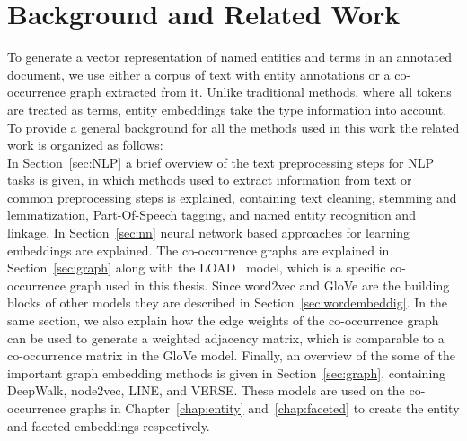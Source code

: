 
\chapter{Background and Related Work}\label{chap:background}
To generate a vector representation of named entities and terms in an annotated document, we use either a corpus of text with entity annotations or a co-occurrence graph extracted from it. Unlike traditional methods, where all tokens are treated as terms, entity embeddings take the type information into account. To provide a general background for all the methods used in this work the related work is organized as follows:\\
In Section~\ref{sec:NLP} a brief overview of the text preprocessing steps for NLP tasks is given, in which methods used to extract information from text or common preprocessing steps is explained, containing text cleaning, stemming and lemmatization, Part-Of-Speech tagging, and named entity recognition and linkage. In Section~\ref{sec:nn} neural network based approaches for learning embeddings are explained. The co-occurrence graphs are explained in Section~\ref{sec:graph} along with the LOAD~ model, which is a specific co-occurrence graph used in this thesis. Since word2vec and GloVe are the building blocks of other models they are described in Section~\ref{sec:wordembeddig}. In the same section, we also explain how the edge weights of the co-occurrence graph can be used to generate a weighted adjacency matrix, which is comparable to a co-occurrence matrix in the GloVe model.  Finally, an overview of the some of the important graph embedding methods is given in Section~\ref{sec:graph}, containing DeepWalk, node2vec, LINE, and VERSE. These models are used on the co-occurrence graphs in Chapter~\ref{chap:entity} and~\ref{chap:faceted} to create the entity and faceted embeddings respectively. 


